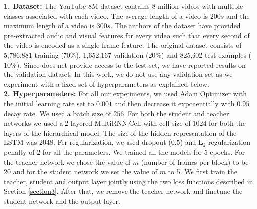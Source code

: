 \documentclass[10pt,twocolumn,letterpaper]{article}
\begin{document}
\noindent \textbf{1. Dataset:}
The YouTube-8M dataset \cite{Youtube8M} contains 8
million videos with multiple classes associated with each video. The average length of a video is $200s$ and the maximum length of a video is $300s$. The authors of the dataset have provided pre-extracted audio and visual features for every video such that every second of the video is encoded as a single frame feature. The original dataset consists of 5,786,881 training ($70\%$), 1,652,167 validation ($20\%$) and 825,602 test examples ($10\%$). Since \cite{Youtube8M} does not provide access to the test set, we have reported results on the validation dataset. In this work, we do not use any validation set as we experiment with a fixed set of hyperparameters as explained below.\\

\noindent \textbf{2. Hyperparameters:}
For all our experiments, we used Adam Optimizer with the initial learning rate set to $0.001$  and then decrease it exponentially with $0.95$ decay rate. We used a batch size of $256$. For both the student and teacher networks we used a $2$-layered MultiRNN Cell with cell size of $1024$ for both the layers of the hierarchical model. The size of the hidden representation of the LSTM was 2048. %
For regularization, we used dropout ($0.5$) and $\mathbf{L}_{2}$ regularization penalty of $2$ for all the parameters. We trained all the models for 5 epochs. For the teacher network we chose the value of $m$ (number of frames per block) to be 20 and for the student network we set the value of $m$ to 5. We first train the teacher, student and output layer jointly using the two loss functions described in Section \ref{section3}. After that, we remove the teacher network and finetune the student network and the output layer. \\
\end{document}
